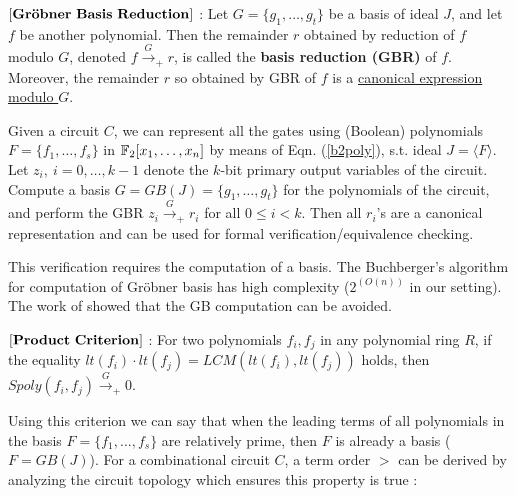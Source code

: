 \begin{Definition}\label{lemma:gbr}
$\bf{\left[Gr\ddot{o}bner\ Basis\ Reduction\right]}$ \cite{gb_book}: Let
  $G=\{g_1,\dots,g_t\}$ be a \Grobner basis of ideal $J$, and let $f$
  be another polynomial.  Then the remainder $r$ obtained by reduction
  of $f$ modulo $G$, denoted $f\xrightarrow{G}_+r$, is called the
  {\bf \Grobner basis reduction (GBR)} of $f$. Moreover, the remainder $r$
  so obtained by GBR of $f$ is a \underline{canonical expression modulo $G$}. 
\end{Definition}





\begin{Proposition}\label{prop:verif}
Given a circuit $C$, we can represent all the gates using (Boolean)
polynomials $F = \{f_1, \dots, f_s\}$ in ${\mathbb{F}}_2[x_1,\dots,x_n]$ by
means of Eqn. (\ref{b2poly}), s.t. ideal $J  = \langle F \rangle$. Let
$z_i, ~i = 0,\dots,{k-1}$ denote the $k$-bit primary output variables
of the circuit.  Compute a \Grobner basis $G = GB(J) =
\{g_1,\dots,g_t\}$ for the polynomials of the circuit, and perform the
GBR $z_i\xrightarrow{G}_+ r_i$ for all $0\leq i
<k$. Then all $r_i$'s are a canonical representation and can be used
for formal verification/equivalence checking.
\end{Proposition}

This verification  requires the computation of a \Grobner basis. The Buchberger's
algorithm for computation of Gr\"obner basis has  high complexity ($2^{(O(n))}$ in our setting). The
work of \cite{lv:tcad2013} showed that the GB computation
can be avoided.

\begin{Definition}\label{prod_criteria}
$\bf{\left[Product \ Criterion\right]}$ \cite{productc:1979}: For two polynomials $f_i,f_j$ 
in any polynomial ring $R$, if the equality 
$lt(f_i)\cdot lt(f_j) = LCM(lt(f_i),lt(f_j))$ holds, then $Spoly(f_i,f_j) \xrightarrow{G}_+ 0$. 
\end{Definition}
 

Using this criterion we can say that when the leading terms of all polynomials in the basis 
$F = \{f_1, \dots, f_s\}$ are relatively prime, then $F$ is already a
\Grobner basis ($F = GB(J)$). For a combinational
circuit $C$, a term order $>$ can be derived by analyzing the circuit
topology which ensures this property is true \cite{wienand:cav08}
\cite{lv:tcad2013}:  

